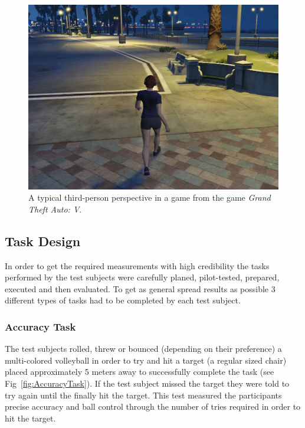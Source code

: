 \documentclass[runningheads,a4paper,oribibl]{llncs}
\begin{document}
\begin{figure}
   \centering
   \includegraphics[width=\textwidth]{ExternalMaterial/GTA}
   \caption{A typical third-person perspective in a game from the game \emph{Grand Theft Auto: V}. \label{fig:GTAIV}}
\end{figure}









\subsection{Task Design} \label{subsec:TaskDesign}

In order to get the required measurements with high credibility the tasks performed by the test subjects were carefully planed, pilot-tested, prepared, executed and then evaluated. To get as general spread results as possible 3 different types of tasks had to be completed by each test subject.

\subsubsection{Accuracy Task}

The test subjects rolled, threw or bounced (depending on their preference) a multi-colored volleyball in order to try and hit a target (a regular sized chair) placed approximately 5 meters away to successfully complete the task (see Fig~\ref{fig:AccuracyTask}). If the test subject missed the target they were told to try again until the finally hit the target. This test measured the participants precise accuracy and ball control through the number of tries required in order to hit the target.
\end{document}
